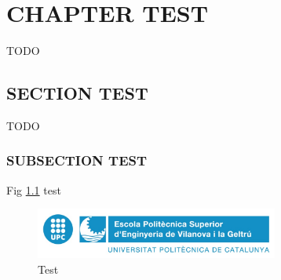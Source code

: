 \newpage
\pagestyle{plain}

\chapter{CHAPTER TEST}

TODO
\section{SECTION TEST}

TODO

\subsection{SUBSECTION TEST}

Fig \ref{fig:test} test

\begin{figure}[h]
    \includegraphics[width=8cm]{media/epsevg_logo}
    \centering
    \caption{Test}
    \label{fig:test}
\end{figure}
